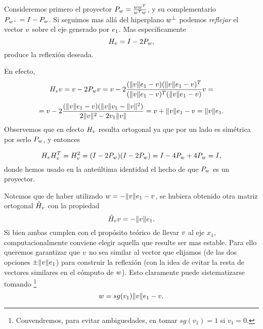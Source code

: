 \begin{tcolorbox}
Consideremos primero el proyector $\Pb_{\wb}=\frac{\wb\wb^T}{\wb^T\wb}$, y su complementario $\Pb_{\wb^\perp}=\Ib-\Pb_{\wb}$. Si seguimos mas allá del hiperplano $\wb^\perp$ podemos \emph{reflejar} el vector $\vb$ sobre el eje generado por $\eb_1$. Mas  específicamente
$$
\Hbb_{\vb}=\Ib-2\Pb_{\wb},
$$
produce la reflexión deseada.

En efecto,
$$\Hbb_{\vb}\vb=\vb-2\Pb_{\wb}\vb=\vb - 2\frac{(\|\vb\|\eb_1-\vb)(\|\vb\|\eb_1-\vb)^T}{(\|\vb\|\eb_1-\vb)^T(\|\vb\|\eb_1-\vb)}\vb=$$
$$= \vb-2\frac{(\|\vb\|\eb_1-\vb)(\|\vb\|v_1-\|\vb\|^2)}{2\|\vb\|^2-2v_1\|\vb\|}
=\vb+\|\vb\|\eb_1-\vb=\|\vb\|\eb_1.$$
Observemos que en efecto $\Hbb_{\vb}$ resulta ortogonal ya que  por un lado es simétrica por serlo $\Pb_{\wb}$, y entonces

$$
\Hbb_{\vb}\Hbb_{\vb}^T=\Hbb_{\vb}^2=
(\Ib-2\Pb_{\wb})(\Ib-2\Pb_{\wb})=
\Ib-4\Pb_{\wb}+4\Pb_{\wb}=\Ib,
$$
donde hemos usado en la anteúltima identidad el hecho de que $\Pb_{\wb}$ es un proyector.

Notemos que de haber utilizado $\wb=-\|\vb\|\eb_1-\vb$, se hubiera obtenido otra matriz ortogonal
$\tHb_{\vb}$ con la propiedad
$$
\tHb_{\vb}\vb=-\|\vb\|\eb_1.
$$
Si bien ambas cumplen con el propósito teórico de llevar $\vb$ al eje $x_1$, computacionalmente conviene elegir aquella que resulte  ser mas estable. Para ello queremos garantizar que $\vb$ no sea similar al vector que elijamos (de las dos opciones $\pm\|\vb\|\eb_1$) para construir la reflexión  (con la idea de evitar la resta de vectores  similares en el cómputo de $\wb$).  Esto claramente puede sistematizarse tomando \footnote{Convendremos, para evitar ambiguedades,  en tomar  $sg(v_1)=1$ si $v_1=0$.}
$$
\wb=sg(v_1)\|\vb\|\eb_1-\vb.
$$


\end{tcolorbox}
